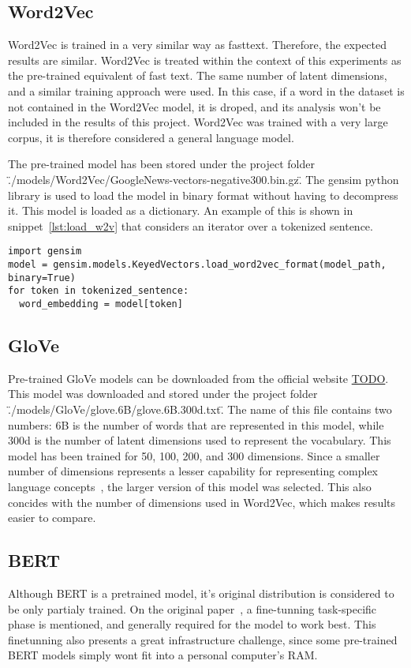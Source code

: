 \subsection{Word2Vec}\label{sub:Word2Vec}
Word2Vec is trained in a very similar way as fasttext. Therefore, the expected results are similar. Word2Vec is treated within the context of this experiments as the pre-trained equivalent of fast text. The same number of latent dimensions, and a similar training approach were used. In this case, if a word in the dataset is not contained in the Word2Vec model, it is droped, and its analysis won't be included in the results of this project. Word2Vec was trained with a very large corpus, it is therefore considered a general language model.

The pre-trained model has been stored under the project folder \"./models/Word2Vec/GoogleNews-vectors-negative300.bin.gz\". The gensim python library is used to load the model in binary format without having to decompress it. This model is loaded as a dictionary. An example of this is shown in snippet~\ref{lst:load_w2v} that considers an iterator over a tokenized sentence.

\begin{lstlisting}[caption={Loading Word2Vec},label=lst:load_w2v,frame=single]
import gensim
model = gensim.models.KeyedVectors.load_word2vec_format(model_path, binary=True)
for token in tokenized_sentence:
  word_embedding = model[token]
\end{lstlisting}

\subsection{GloVe}\label{sub:GloVe}
Pre-trained GloVe models can be downloaded from the official website \url{TODO}. This model was downloaded and stored under the project folder \"./models/GloVe/glove.6B/glove.6B.300d.txt\". The name of this file contains two numbers: 6B is the number of words that are represented in this model, while 300d is the number of latent dimensions used to represent the vocabulary. This model has been trained for 50, 100, 200, and 300 dimensions. Since a smaller number of dimensions represents a lesser capability for representing complex language concepts~\cite{penningto2014glove}, the larger version of this model was selected. This also concides with the number of dimensions used in Word2Vec, which makes results easier to compare.

\subsection{BERT}\label{sub:BERT}
Although BERT is a pretrained model, it's original distribution is considered to be only partialy trained. On the original paper~\cite{devlin2019bert}, a fine-tunning task-specific phase is mentioned, and generally required for the model to work best. This fine\-tunning also presents a great infrastructure challenge, since some pre-trained BERT models simply wont fit into a personal computer's RAM.\@

